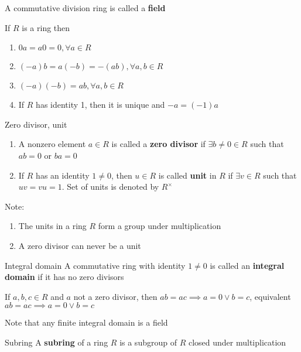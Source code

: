 \documentclass[titlepage, 12pt]{article}
\begin{document}
A commutative division ring is called a \textbf{field}

\begin{proposition}{}{}
    If $R$ is a ring then
    \begin{enumerate}
        \item $0a=a0=0, \forall a\in R$
        \item $(-a)b=a(-b)=-(ab), \forall a,b\in R$
        \item $(-a)(-b) = ab,\forall a,b\in R$
        \item If $R$ has identity 1, then it is unique and $-a = (-1)a$
    \end{enumerate}
\end{proposition}

\begin{definition}{Zero divisor, unit}{}
    \begin{enumerate}
        \item A nonzero element $a\in R$ is called a \textbf{zero divisor} if
        $\exists b\neq 0\in R$ such that $ab=0$ or $ba=0$
        \item If $R$ has an identity $1\neq 0$, then $u\in R$ is called
        \textbf{unit} in $R$ if $\exists v\in R$ such that $uv=vu=1$. Set of
        units is denoted by $R^\times$
    \end{enumerate}
\end{definition}
 Note:
\begin{enumerate}
    \item The units in a ring $R$ form a group under multiplication
    \item A zero divisor can never be a unit
\end{enumerate}

\begin{definition}{Integral domain}{}
    A commutative ring with identity $1\neq 0$ is called an \textbf{integral
    domain} if it has no zero divisors
\end{definition}

\begin{proposition}{}{}
    If $a,b,c\in R$ and $a$ not a zero divisor, then $ab=ac\implies a = 0 \lor b =
    c$, equivalent $ab=ac\implies a = 0\lor b = c$
\end{proposition}

Note that any finite integral domain is a field

\begin{definition}{Subring}{}
    A \textbf{subring} of a ring $R$ is a subgroup of $R$ closed under
    multiplication
\end{definition}
\end{document}
